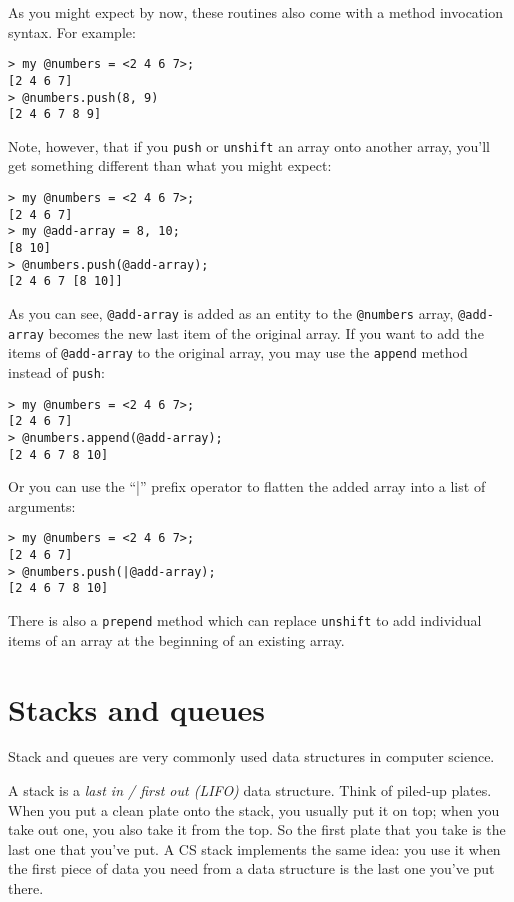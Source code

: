 As you might expect by now, these routines also come with a 
method invocation syntax. For example:

\begin{verbatim}
> my @numbers = <2 4 6 7>;
[2 4 6 7]
> @numbers.push(8, 9)
[2 4 6 7 8 9]
\end{verbatim}

Note, however, that if you {\tt push} or {\tt unshift} an 
array onto another array, you'll get something different 
than what you might expect:

\begin{verbatim}
> my @numbers = <2 4 6 7>;
[2 4 6 7]
> my @add-array = 8, 10;
[8 10]
> @numbers.push(@add-array);
[2 4 6 7 [8 10]]
\end{verbatim}

As you can see, \verb'@add-array' is added as an entity 
to the \verb'@numbers' array, \verb'@add-array' becomes 
the new last item of the original array. If you want to 
add the items of \verb'@add-array' to the original array, 
you may use the {\tt append} method instead of {\tt push}:

\begin{verbatim}
> my @numbers = <2 4 6 7>;
[2 4 6 7]
> @numbers.append(@add-array);
[2 4 6 7 8 10]
\end{verbatim}

Or you can use the ``|'' prefix operator to flatten the 
added array into a list of arguments:

\begin{verbatim}
> my @numbers = <2 4 6 7>;
[2 4 6 7]
> @numbers.push(|@add-array);
[2 4 6 7 8 10]
\end{verbatim}

There is also a {\tt prepend} method which can replace 
{\tt unshift} to add individual items of an array at the 
beginning of an existing array.


\section{Stacks and queues}
\label{stacks_queues}

Stack and queues are very commonly used data structures in 
computer science.

A stack is a \emph{last in / first out (LIFO)} data structure. Think of 
piled-up plates. When you put a clean plate onto the stack, 
you usually put it on top; when you take out one, you also 
take it from the top. So the first plate that you take 
is the last one that you've put. A CS stack implements the same 
idea: you use it when the first piece of data you need from a 
data structure is the last one you've put there.

